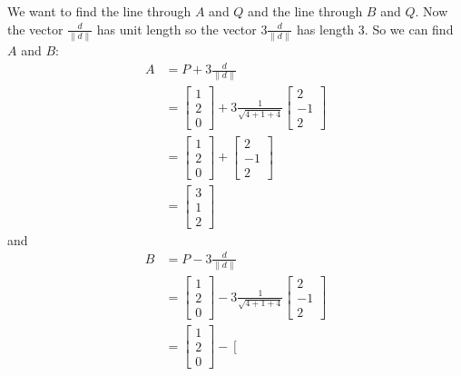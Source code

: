 \documentclass{article}
\begin{document}
\begin{Answer}
  We want to find the line through $A$ and $Q$ and the line through $B$ and $Q$.
  Now the vector $\frac{d}{\|d\|}$ has unit length so the vector $3\frac{d}{\|d\|}$ has length $3$.
  So we can find $A$ and $B$:
  \begin{align*}
  A &= P + 3 \frac{d}{\|d\|} \\
  &= \left[
  \begin{array}{c}
  1\\
  2\\
  0
  \end{array}
  \right]+3 \frac{1}{\sqrt{4+1+4}}\left[
  \begin{array}{c}
  2\\
  -1\\
  2
  \end{array}
  \right] \\
  &= \left[
  \begin{array}{c}
  1\\
  2\\
  0
  \end{array}
  \right]+\left[
  \begin{array}{c}
  2\\
  -1\\
  2
  \end{array}
  \right] \\
  &= 
  \left[
  \begin{array}{c}
  3\\
  1\\
  2
  \end{array}
  \right]
  \end{align*}
  and
  \begin{align*}
    B &= P - 3 \frac{d}{\|d\|}\\
    &=\left[
  \begin{array}{c}
  1\\
  2\\
  0
  \end{array}
  \right]-3 \frac{1}{\sqrt{4+1+4}}\left[
  \begin{array}{c}
  2\\
  -1\\
  2
  \end{array}
  \right] \\
  &=\left[
  \begin{array}{c}
  1\\
  2\\
  0
  \end{array}
  \right]-\left[
  \begin{array}{c}

\end{array}
\end{align*}
\end{Answer}
\end{document}

